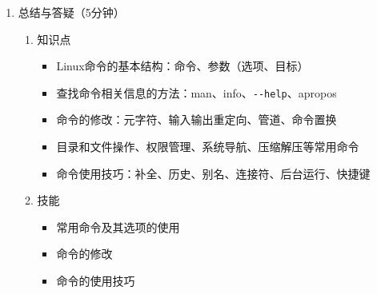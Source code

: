 \documentclass{TIJMUjiaoanLL}
\begin{document}
\begin{enumerate}
  \item 总结与答疑（5分钟）
    \begin{enumerate}
      \item 知识点
	\begin{itemize}
	  \item Linux命令的基本结构：命令、参数（选项、目标）
	  \item 查找命令相关信息的方法：man、info、\verb|--help|、apropos
          \item 命令的修改：元字符、输入输出重定向、管道、命令置换
          \item 目录和文件操作、权限管理、系统导航、压缩解压等常用命令
          \item 命令使用技巧：补全、历史、别名、连接符、后台运行、快捷键
	\end{itemize}
      \item 技能
	\begin{itemize}
          \item 常用命令及其选项的使用
          \item 命令的修改
          \item 命令的使用技巧
	\end{itemize}
    \end{enumerate}

\end{enumerate}

\otherTail
\end{document}
